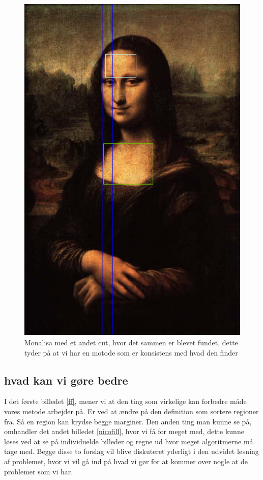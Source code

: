 \begin{figure}[h!!]
	\begin{center}
		\includegraphics[scale=0.50,angle=0]{afsnit/afprovning/billeder/BBMonalisacut1.png}
	\end{center}
	\caption[]{Monalisa med et andet cut, hvor det sammen er blevet fundet, dette tyder på at vi har en motode som er konsistens med hvad den finder}
	\label{BBMonalisacut1}
\end{figure}


\subsection{hvad kan vi gøre bedre}
I det første billedet \ref{ff}, mener vi at den ting som virkelige kan
forbedre måde vores metode arbejder på. Er ved at ændre på den
definition som sortere regioner fra. Så en region kan krydse begge
marginer. Den anden ting man kunne se på, omhandler det andet billedet
\ref{nicofill}, hvor vi få for meget med, dette kunne løses ved at se på
individuelde billeder og regne ud hvor meget algoritmerne må tage med.
Begge disse to forslag vil blive diskuteret yderligt i den udvidet
løsning af problemet, hvor vi vil gå ind på hvad vi gør for at kommer
over nogle at de problemer som vi har.
